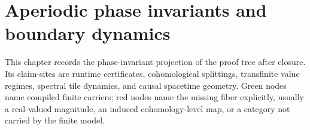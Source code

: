 \chapter{Aperiodic phase invariants and boundary dynamics}\label{ch:dynamics-frontier}

This chapter records the phase-invariant projection of the proof tree after
closure.  Its claim-sites are runtime certificates, cohomological splittings,
transfinite value regimes, spectral tile dynamics, and causal spacetime
geometry.  Green nodes name compiled finite carriers; red nodes name the
missing fiber explicitly, usually a real-valued magnitude, an induced
cohomology-level map, or a category not carried by the finite model.






